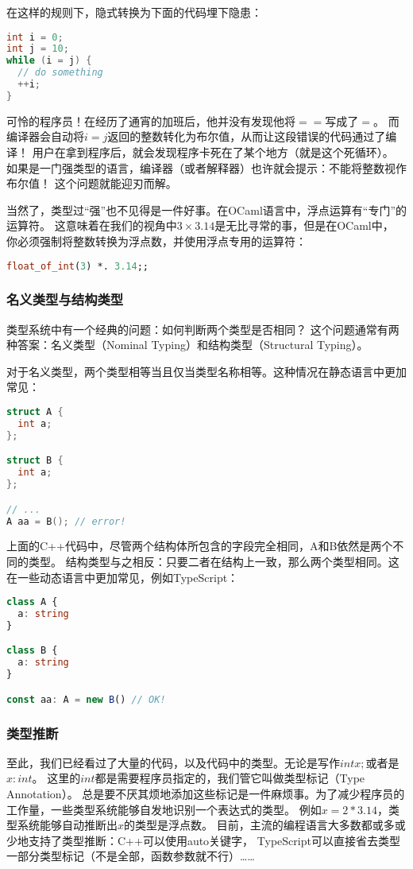 \documentclass[../main.tex]{subfiles}
\begin{document}
  \indent 在这样的规则下，隐式转换为下面的代码埋下隐患：

\begin{lstlisting}[language=c]
int i = 0;
int j = 10;
while (i = j) {
  // do something
  ++i;
}
\end{lstlisting}

  \indent 可怜的程序员！在经历了通宵的加班后，他并没有发现他将$==$写成了$=$。
  而编译器会自动将$i = j$返回的整数转化为布尔值，从而让这段错误的代码通过了编译！
  用户在拿到程序后，就会发现程序卡死在了某个地方（就是这个死循环）。
  如果是一门强类型的语言，编译器（或者解释器）也许就会提示：不能将整数视作布尔值！
  这个问题就能迎刃而解。

  \indent 当然了，类型过“强”也不见得是一件好事。在OCaml语言中，浮点运算有“专门”的运算符。
  这意味着在我们的视角中$3 \times 3.14$是无比寻常的事，但是在OCaml中，
  你必须强制将整数转换为浮点数，并使用浮点专用的运算符：

\begin{lstlisting}[language=ml]
float_of_int(3) *. 3.14;;
\end{lstlisting}

  \subsubsection*{名义类型与结构类型}
  \indent 类型系统中有一个经典的问题：如何判断两个类型是否相同？
  这个问题通常有两种答案：名义类型（Nominal Typing）和结构类型（Structural Typing）。

  \indent 对于名义类型，两个类型相等当且仅当类型名称相等。这种情况在静态语言中更加常见：

\begin{lstlisting}[language=c++]
struct A {
  int a;
};

struct B {
  int a;
};

// ...
A aa = B(); // error!
\end{lstlisting}

  \indent 上面的C++代码中，尽管两个结构体所包含的字段完全相同，A和B依然是两个不同的类型。
  结构类型与之相反：只要二者在结构上一致，那么两个类型相同。这在一些动态语言中更加常见，例如TypeScript：

\begin{lstlisting}[language=TypeScript]
class A {
  a: string
}

class B {
  a: string
}

const aa: A = new B() // OK!
\end{lstlisting}

  \subsubsection*{类型推断}
  \indent 至此，我们已经看过了大量的代码，以及代码中的类型。无论是写作$int x;$或者是$x: int$。
  这里的$int$都是需要程序员指定的，我们管它叫做类型标记（Type Annotation）。
  总是要不厌其烦地添加这些标记是一件麻烦事。为了减少程序员的工作量，一些类型系统能够自发地识别一个表达式的类型。
  例如$x = 2 * 3.14$，类型系统能够自动推断出$x$的类型是浮点数。
  目前，主流的编程语言大多数都或多或少地支持了类型推断：C++可以使用auto关键字，
  TypeScript可以直接省去类型一部分类型标记（不是全部，函数参数就不行）……
\end{document}
